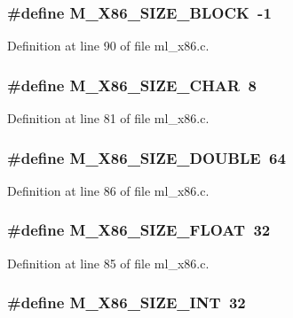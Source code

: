 \subsubsection{\setlength{\rightskip}{0pt plus 5cm}\#define M\_\-X86\_\-SIZE\_\-BLOCK~-1}\label{ml__x86_8c_a9139669b79d9b440027d9dabb4be72c}




Definition at line 90 of file ml\_\-x86.c.
\subsubsection{\setlength{\rightskip}{0pt plus 5cm}\#define M\_\-X86\_\-SIZE\_\-CHAR~8}\label{ml__x86_8c_fad43b7d4c2fc975fae1c51bf20fb71b}




Definition at line 81 of file ml\_\-x86.c.
\subsubsection{\setlength{\rightskip}{0pt plus 5cm}\#define M\_\-X86\_\-SIZE\_\-DOUBLE~64}\label{ml__x86_8c_408dd8135a7c354d92b8bdf9c79db77d}




Definition at line 86 of file ml\_\-x86.c.
\subsubsection{\setlength{\rightskip}{0pt plus 5cm}\#define M\_\-X86\_\-SIZE\_\-FLOAT~32}\label{ml__x86_8c_b6bd244173e8a184d7ffd00345d104c9}




Definition at line 85 of file ml\_\-x86.c.
\subsubsection{\setlength{\rightskip}{0pt plus 5cm}\#define M\_\-X86\_\-SIZE\_\-INT~32}\label{ml__x86_8c_85eb1a82739558ac934d5f5554a58747}




